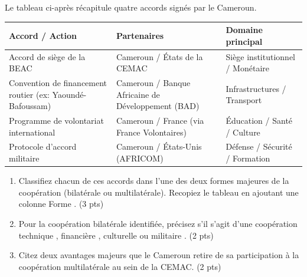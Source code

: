 \documentclass[11pt]{article}
\begin{document}
\begin{exercice}
Le tableau ci-après récapitule quatre accords signés par le Cameroun.
\begin{center}
\begin{tabular}{|p{3.5cm}|p{4cm}|p{4cm}|}
\hline
\textbf{Accord / Action} & \textbf{Partenaires} & \textbf{Domaine principal} \\
\hline
Accord de siège de la BEAC & Cameroun / États de la CEMAC & Siège institutionnel / Monétaire \\
\hline
Convention de financement routier (ex: Yaoundé-Bafoussam) & Cameroun / Banque Africaine de Développement (BAD) & Infrastructures / Transport \\
\hline
Programme de volontariat international & Cameroun / France (via France Volontaires) & Éducation / Santé / Culture \\
\hline
Protocole d'accord militaire & Cameroun / États-Unis (AFRICOM) & Défense / Sécurité / Formation \\
\hline
\end{tabular}
\end{center}
\begin{enumerate}
    \item Classifiez chacun de ces accords dans l'une des deux formes majeures de la coopération (bilatérale ou multilatérale). Recopiez le tableau en ajoutant une colonne \og Forme \fg{}. (3 pts)
    \item Pour la coopération bilatérale identifiée, précisez s'il s'agit d'une coopération \og technique \fg{}, \og financière \fg{}, \og culturelle \fg{} ou \og militaire \fg{}. (2 pts)
    \item Citez deux avantages majeurs que le Cameroun retire de sa participation à la coopération multilatérale au sein de la CEMAC. (2 pts)
\end{enumerate}
\end{exercice}
\end{document}
